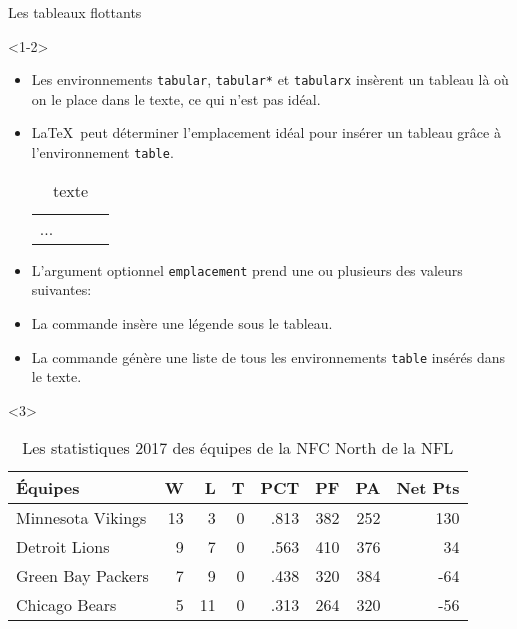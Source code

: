 \begin{frame}[fragile]{Les tableaux flottants}
	
	\begin{onlyenv}<1-2>
		\begin{itemize}
			\item Les environnements \texttt{tabular}, \texttt{tabular*} et \texttt{tabularx} insèrent
				un tableau là où on le place dans le texte, ce qui n'est pas idéal.
			\item \LaTeX\ peut déterminer l'emplacement idéal pour insérer un tableau grâce à l'environnement \texttt{table}.
\begin{codesource}
	\begin{table}[emplacement]
		\begin{tabularx}{\textwidth}{lccc}
			...
		\end{tabularx}
		\caption{texte}
	\end{table}
\end{codesource}

			\pause
			\item L'argument optionnel \texttt{emplacement} prend une ou plusieurs des valeurs suivantes:
			\item La commande  insère une légende sous le tableau.
			\item La commande  génère une liste de tous les environnements \texttt{table} insérés dans le texte.
		\end{itemize}
	\end{onlyenv}

	\begin{onlyenv}
		\begin{codesource}
\begin{table}
	\begin{tabularx}{\textwidth}{X|rrr|r|rrr}
		\'{E}quipes			&	W	&	L	&	T	&	PCT		&	PF	&	PA	&	Net Pts \\
		\hline
		Minnesota Vikings	&	13	&	3	&	0	&	.813	&	382	&	252	&	130 \\
		Detroit Lions		&	9	&	7	&	0	&	.563	&	410	&	376	&	34 \\
		Green Bay Packers	&	7	&	9	& 	0	&	.438	&	320	&	384	&	-64 \\
		Chicago Bears		&	5	&	11	&	0	&	.313	&	264	&	320	&	-56
	\end{tabularx}
	\caption{Les statistiques 2017 des équipes de la NFC North de la NFL}
\end{table}
		\end{codesource}
		

\end{onlyenv}
\end{frame}
